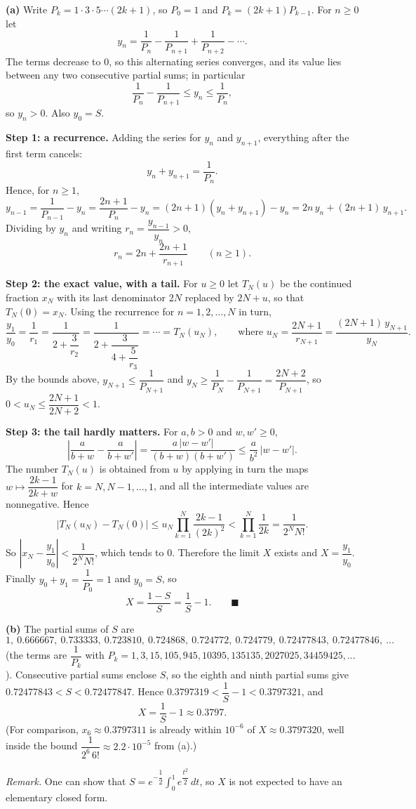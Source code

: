 \textbf{(a)} Write $P_k=1\cdot3\cdot5\cdots(2k+1)$, so $P_0=1$ and $P_k=(2k+1)P_{k-1}$. For $n\ge0$ let
\[y_n=\dfrac{1}{P_n}-\dfrac{1}{P_{n+1}}+\dfrac{1}{P_{n+2}}-\cdots .\]
The terms decrease to $0$, so this alternating series converges, and its value lies between any two consecutive partial sums; in particular
\[\dfrac{1}{P_n}-\dfrac{1}{P_{n+1}}\le y_n\le\dfrac{1}{P_n},\]
so $y_n>0$. Also $y_0=S$.

\textbf{Step 1: a recurrence.} Adding the series for $y_n$ and $y_{n+1}$, everything after the first term cancels:
\[y_n+y_{n+1}=\dfrac{1}{P_n}.\]
Hence, for $n\ge1$,
\[y_{n-1}=\dfrac{1}{P_{n-1}}-y_n=\dfrac{2n+1}{P_n}-y_n=(2n+1)\left(y_n+y_{n+1}\right)-y_n=2n\,y_n+(2n+1)\,y_{n+1}.\]
Dividing by $y_n$ and writing $r_n=\dfrac{y_{n-1}}{y_n}>0$,
\[r_n=2n+\dfrac{2n+1}{r_{n+1}}\qquad(n\ge1).\]

\textbf{Step 2: the exact value, with a tail.} For $u\ge0$ let $T_N(u)$ be the continued fraction $x_N$ with its last denominator $2N$ replaced by $2N+u$, so that $T_N(0)=x_N$. Using the recurrence for $n=1,2,\dots,N$ in turn,
\[\dfrac{y_1}{y_0}=\dfrac{1}{r_1}=\dfrac{1}{2+\dfrac{3}{r_2}}=\dfrac{1}{2+\dfrac{3}{4+\dfrac{5}{r_3}}}=\cdots=T_N(u_N),\qquad\text{where } u_N=\dfrac{2N+1}{r_{N+1}}=\dfrac{(2N+1)\,y_{N+1}}{y_N}.\]
By the bounds above, $y_{N+1}\le\dfrac{1}{P_{N+1}}$ and $y_N\ge\dfrac{1}{P_N}-\dfrac{1}{P_{N+1}}=\dfrac{2N+2}{P_{N+1}}$, so $0<u_N\le\dfrac{2N+1}{2N+2}<1$.

\textbf{Step 3: the tail hardly matters.} For $a,b>0$ and $w,w'\ge0$,
\[\left|\dfrac{a}{b+w}-\dfrac{a}{b+w'}\right|=\dfrac{a\,|w-w'|}{(b+w)(b+w')}\le\dfrac{a}{b^2}\,|w-w'| .\]
The number $T_N(u)$ is obtained from $u$ by applying in turn the maps $w\mapsto\dfrac{2k-1}{2k+w}$ for $k=N,N-1,\dots,1$, and all the intermediate values are nonnegative. Hence
\[\left|T_N(u_N)-T_N(0)\right|\le u_N\prod_{k=1}^{N}\dfrac{2k-1}{(2k)^2}<\prod_{k=1}^{N}\dfrac{1}{2k}=\dfrac{1}{2^N N!}.\]
So $\left|x_N-\dfrac{y_1}{y_0}\right|<\dfrac{1}{2^NN!}$, which tends to $0$. Therefore the limit $X$ exists and $X=\dfrac{y_1}{y_0}$. Finally $y_0+y_1=\dfrac{1}{P_0}=1$ and $y_0=S$, so
\[X=\dfrac{1-S}{S}=\boxed{\dfrac{1}{S}-1}.\qquad\blacksquare\]

\textbf{(b)} The partial sums of $S$ are
\[1,\ 0.666667,\ 0.733333,\ 0.723810,\ 0.724868,\ 0.724772,\ 0.724779,\ 0.72477843,\ 0.72477846,\ \dots\]
(the terms are $\dfrac{1}{P_k}$ with $P_k=1,3,15,105,945,10395,135135,2027025,34459425,\dots$). Consecutive partial sums enclose $S$, so the eighth and ninth partial sums give $0.72477843<S<0.72477847$. Hence $0.3797319<\dfrac{1}{S}-1<0.3797321$, and
\[X=\dfrac{1}{S}-1\approx\boxed{0.3797}.\]
(For comparison, $x_6\approx0.3797311$ is already within $10^{-6}$ of $X\approx0.3797320$, well inside the bound $\dfrac{1}{2^6\,6!}\approx2.2\cdot10^{-5}$ from (a).)

\emph{Remark.} One can show that $S=e^{-\dfrac{1}{2}}\displaystyle\int_0^1e^{\dfrac{t^2}{2}}\,dt$, so $X$ is not expected to have an elementary closed form.
